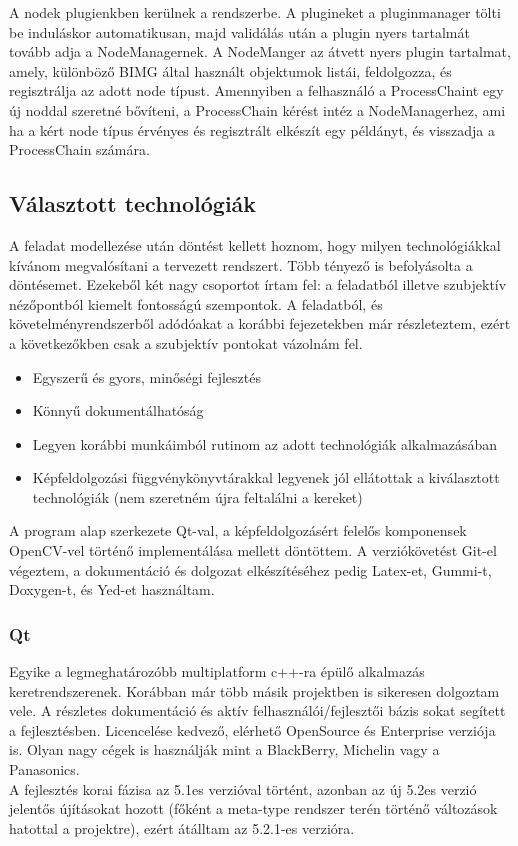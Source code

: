 \documentclass[a4paper,12pt,oneside]{report}
\begin{document}
A nodek plugienkben kerülnek a rendszerbe. A plugineket a pluginmanager tölti be induláskor automatikusan, majd validálás után a plugin nyers tartalmát tovább adja a NodeManagernek. A NodeManger az átvett nyers plugin tartalmat, amely, különböző BIMG által használt objektumok listái, feldolgozza, és regisztrálja az adott node típust. Amennyiben a felhasználó a ProcessChaint egy új noddal szeretné bővíteni, a ProcessChain kérést intéz a NodeManagerhez, ami ha a kért node típus érvényes és regisztrált elkészít egy példányt, és visszadja a ProcessChain számára.

\subsection{Választott technológiák}
A feladat modellezése után döntést kellett hoznom, hogy milyen technológiákkal kívánom megvalósítani a tervezett rendszert. Több tényező is befolyásolta a döntésemet. Ezekeből két nagy csoportot írtam fel: a feladatból illetve szubjektív nézőpontból kiemelt fontosságú szempontok. A feladatból, és követelményrendszerből adódóakat a korábbi fejezetekben már részleteztem, ezért a következőkben csak a szubjektív pontokat vázolnám fel.
\begin{itemize}
	\itemsep0em
	\item Egyszerű és gyors, minőségi fejlesztés
	\item Könnyű dokumentálhatóság
	\item Legyen korábbi munkáimból rutinom az adott technológiák alkalmazásában
	\item Képfeldolgozási függvénykönyvtárakkal legyenek jól ellátottak a kiválasztott technológiák (nem szeretném újra feltalálni a kereket)
\end{itemize}
A program alap szerkezete Qt-val, a képfeldolgozásért felelős komponensek OpenCV-vel történő implementálása mellett döntöttem. A verziókövetést Git-el végeztem, a dokumentáció és dolgozat elkészítéséhez pedig Latex-et, Gummi-t, Doxygen-t, és Yed-et használtam.
\subsubsection{Qt}
Egyike a legmeghatározóbb\cite{website:qt_1_million} multiplatform c++-ra épülő alkalmazás keretrendszerenek. \cite{website:qt_about} Korábban már több másik projektben is sikeresen dolgoztam vele. A részletes dokumentáció és aktív felhasználói/fejlesztői bázis sokat segített a fejlesztésben. \cite{website:qt_dochome} \cite{website:qt_docforum}\cite{website:qt_docmaillist} Licencelése kedvező, elérhető OpenSource és Enterprise verziója is. Olyan nagy cégek is használják mint a BlackBerry, Michelin vagy a Panasonics.\cite{website:qt_in_use} \\ A fejlesztés korai fázisa az 5.1es verzióval történt, azonban az új 5.2es verzió jelentős újításokat hozott (főként a meta-type rendszer terén történő változások hatottal a projektre), ezért átálltam az 5.2.1-es verzióra.
\end{document}
